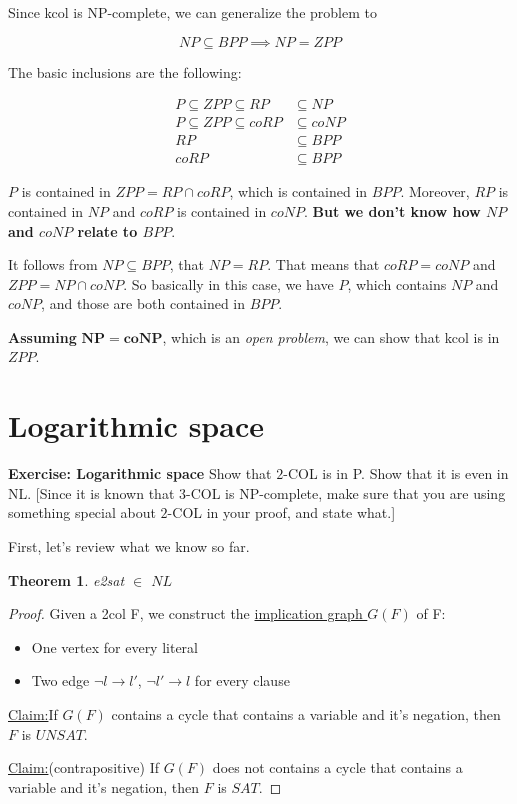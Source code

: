 \documentclass[12pt, a4paper]{article} %
\newtheorem{theorem}{Theorem}[section]     %
\newenvironment{claim}[1]{\par\noindent\underline{Claim:}\space#1}{}
\begin{document}
Since \acrshort{kcol} is NP-complete, we can generalize the problem to

\[
  NP \subseteq BPP \implies NP = ZPP
\]

The basic inclusions are the following:

\begin{align*}
  P \subseteq ZPP \subseteq RP   &\subseteq NP   \\
  P \subseteq ZPP \subseteq coRP &\subseteq coNP \\
                              RP &\subseteq BPP  \\
                            coRP &\subseteq BPP
\end{align*}

$P$ is contained in $ZPP = RP \cap coRP$, which is contained in $BPP$. Moreover, $RP$ is contained in $NP$ and $coRP$ is contained in $coNP$. \textbf{But we don't know how $NP$ and $coNP$ relate to $BPP$}.

It follows from $NP \subseteq BPP$, that $NP = RP$. That means that $ coRP = coNP$ and $ZPP = NP \cap coNP $. So basically in this case, we have $P$, which contains $NP$ and $coNP$, and those are both contained in $BPP$.

\textbf{Assuming} $\bm{NP = coNP}$, which is an \textit{open problem}, we can show that \acrshort{kcol} is in $ZPP$.



\newpage

\section{Logarithmic space}

\textbf{Exercise: Logarithmic space} Show that $2$-COL is in P. Show that it is even in NL. [Since it is known that 3-COL is NP-complete, make sure that you are using something special about $2$-COL in your proof, and state what.]

First, let's review what we know so far.

\begin{theorem}\label{teo}
  \acrshort{e2sat} $\in$ $NL$
\end{theorem}

\begin{proof}
  Given a \acrshort{2col} F, we construct the \underline{implication graph $G(F)$} of F:
  \begin{itemize}
    \item One vertex for every literal
    \item Two edge $\neg l \to l'$, $\neg l' \to l$ for every clause
  \end{itemize}

  \begin{claim}
    If $G(F)$ contains a cycle that contains a variable and it's negation, then $F$ is $UNSAT$.
  \end{claim}
  \begin{claim}
    (contrapositive) If $G(F)$ does not contains a cycle that contains a variable and it's negation, then $F$ is $SAT$.
  \end{claim}
\end{proof}
\end{document}
